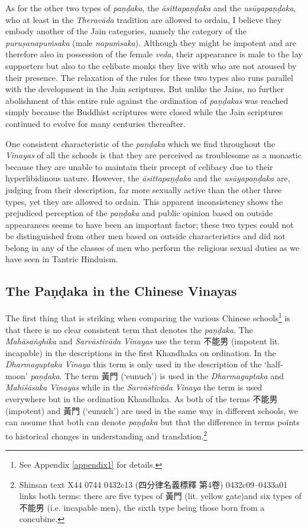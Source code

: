 As for the other two types of \textit{paṇḍaka}, the \textit{āsittapaṇḍaka} and the \textit{usūyapaṇḍaka}, who at least in the \textit{Theravāda} tradition are allowed to ordain, I believe they embody another of the Jain categories, namely the category of the \textit{puruṣanapuṁsaka} (male \textit{napuṁsaka}). Although they might be impotent and are therefore also in possession of the female \textit{veda}, their appearance is male to the lay supporters but also to the celibate monks they live with who are not aroused by their presence. The relaxation of the rules for these two types also runs parallel with the development in the Jain scriptures. But unlike the Jains, no further abolishment of this entire rule against the ordination of \textit{paṇḍakas} was reached simply because the Buddhist scriptures were closed while the Jain scriptures continued to evolve for many centuries thereafter.

One consistent characteristic of the \textit{paṇḍaka} which we find throughout the \textit{Vinayas} of all the schools is that they are perceived as troublesome as a monastic because they are unable to maintain their precept of celibacy due to their hyperlibidinous nature. However, the \textit{āsittapaṇḍaka} and the \textit{usūyapaṇḍaka} are, judging from their description, far more sexually active than the other three types, yet they are allowed to ordain. This apparent inconsistency shows the prejudiced perception of the \textit{paṇḍaka} and public opinion based on outside appearances seems to have been an important factor; these two types could not be distinguished from other men based on outside characteristics and did not belong in any of the classes of men who perform the religious sexual duties as we have seen in Tantric Hinduism.

\subsection{The Paṇḍaka in the Chinese Vinayas}
\label{pandakainchinese}
The first thing that is striking when comparing the various Chinese schools\footnote{See Appendix \ref{appendix1} for details.} is that there is no clear consistent term that denotes the \textit{paṇḍaka}. The \textit{Mahāsaṅghika} and \textit{Sarvāstivāda} \textit{Vinayas} use the term 不能男 (impotent lit. incapable) in the descriptions in the first Khandhaka on ordination. In the \textit{Dharmaguptaka} \textit{Vinaya} this term is only used in the description of the `half-moon' \textit{paṇḍaka}. The term 黃門 (`eunuch') is used in the \textit{Dharmaguptaka} and \textit{Mahīśāsaka} \textit{Vinayas} while in the \textit{Sarvāstivāda} \textit{Vinaya} the term is used everywhere but in the ordination Khandhaka. As both of the terms 不能男 (impotent) and 黃門 (`eunuch') are used in the same way in different schools, we can assume that both can denote \textit{paṇḍaka} but that the difference in terms points to historical changes in understanding and translation.\footnote{Shinsan text X44 0744 0432c13 (四分律名義標釋 第4卷) 0432c09–0433a01 links both terms: there are five types of 黃門 (lit. yellow gate)and six types of 不能男 (i.e. incapable men), the sixth type being those born from a concubine.}

